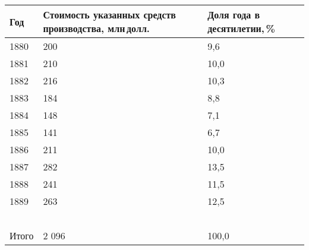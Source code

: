 \documentclass[leqno]{article}  %
\begin{document}
\begin{table}[htbp]
    \centering
    \footnotesize{
        \begin{tabular}{p{}|p{}|p{}}
            \hline
            \centering Год & Стоимость указанных средств производства, млн\,долл. & Доля года в десятилетии,\,\% \\
            \hline
            1880 & \hfill 200 \hspace*{1cm} & \hfill 9,6 \hspace*{1cm} \\
            1881 & \hfill 210 \hspace*{1cm} & \hfill 10,0 \hspace*{1cm} \\
            1882 & \hfill 216 \hspace*{1cm} & \hfill 10,3 \hspace*{1cm} \\
            1883 & \hfill 184 \hspace*{1cm} & \hfill 8,8 \hspace*{1cm} \\
            1884 & \hfill 148 \hspace*{1cm} & \hfill 7,1 \hspace*{1cm} \\
            1885 & \hfill 141 \hspace*{1cm} & \hfill 6,7 \hspace*{1cm} \\
            1886 & \hfill 211 \hspace*{1cm} & \hfill 10,0 \hspace*{1cm} \\
            1887 & \hfill 282 \hspace*{1cm} & \hfill 13,5 \hspace*{1cm} \\
            1888 & \hfill 241 \hspace*{1cm} & \hfill 11,5 \hspace*{1cm} \\
            1889 & \hfill 263 \hspace*{1cm} & \hfill 12,5 \hspace*{1cm} \\
            & \hfill  \hrulefill\ \hspace*{1cm} & \hfill  \hrulefill\ \hspace*{1cm} \\
            \centering Итого & \hfill 2 096 \hspace*{1cm} & \hfill 100,0 \hspace*{1cm} \\
            \hline
        \end{tabular}
    }
\end{table}
\end{document}

